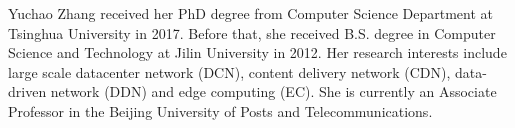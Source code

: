 \documentclass[10pt,journal,compsoc]{IEEEtran}
\begin{document}
\maketitle


%


%
%


%
%
%


%
%
%





%

%
%

%
%
%

%


%
%








%


\newpage

\begin{IEEEbiography}
{Yuchao Zhang} received her PhD degree from Computer Science Department at Tsinghua University in 2017. Before that, she received B.S. degree in Computer Science and Technology at Jilin University in 2012. Her research interests include large scale datacenter network (DCN), content delivery network (CDN), data-driven network (DDN) and edge computing (EC). She is currently an Associate Professor in the Beijing University of Posts and Telecommunications.
\end{IEEEbiography}
\end{document}

